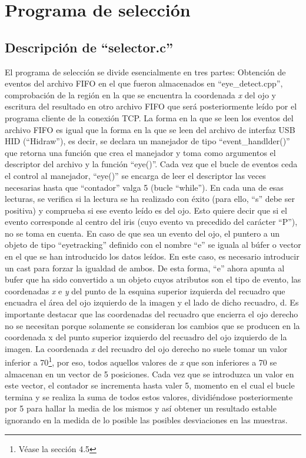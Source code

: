 \section{Programa de selección} \label{s3_4}

\subsection{Descripción de ``selector.c''} \label{s3_4_1}

El programa de selección se divide esencialmente en tres partes: Obtención de eventos del archivo FIFO en el que fueron almacenados en ``eye\_detect.cpp'', comprobación de la región en la que se encuentra la coordenada {\itshape x} del ojo y escritura del resultado en otro archivo FIFO que será posteriormente leído por el programa cliente de la conexión TCP. La forma en la que se leen los eventos del archivo FIFO es igual que la forma en la que se leen del archivo de interfaz USB HID (``Hidraw''), es decir, se declara un manejador de tipo ``event\_handlder()''  que retorna una función que crea el manejador y toma como argumentos el descriptor del archivo y la función ``eye()''. Cada vez que el bucle de eventos ceda el control al manejador, ``eye()'' se encarga de leer el descriptor las veces necesarias hasta que ``contador'' valga 5 (bucle ``while''). En cada una de esas lecturas, se verifica si la lectura se ha realizado con éxito (para ello, ``s'' debe ser positiva) y comprueba si ese evento leído es del ojo. Esto quiere decir que si el evento corresponde al centro del iris (cuyo evento va precedido del carácter ``P''), no se toma en cuenta. En caso de que sea un evento del ojo, el puntero a un objeto de tipo ``eyetracking'' definido con el nombre ``e'' se iguala al búfer o vector en el que se han introducido los datos leídos. En este caso, es necesario introducir un cast para forzar la igualdad de ambos. De esta forma, ``e'' ahora apunta al bufer que ha sido convertido a un objeto cuyos atributos son el tipo de evento, las coordenadas {\itshape x} e {\itshape y} del punto de la esquina superior izquierda del recuadro que encuadra el área del ojo izquierdo de la imagen y el lado de dicho recuadro, d. Es importante destacar que las coordenadas del recuadro que encierra el ojo derecho no se necesitan porque solamente se consideran los cambios que se producen en la coordenada x del punto superior izquierdo del recuadro del ojo izquierdo de la imagen. La coordenada {\itshape x} del recuadro del ojo derecho no suele tomar un valor inferior a 70\footnote{Véase la sección 4.5}, por eso, todos aquellos valores de {\itshape x} que son inferiores a 70 se almacenan en un vector de 5 posiciones. Cada vez que se introduzca un valor en este vector, el contador se incrementa hasta valer 5, momento en el cual el bucle termina y se realiza la suma de todos estos valores, dividiéndose posteriormente por 5 para hallar la media de los mismos y así obtener un resultado estable ignorando en la medida de lo posible las posibles desviaciones en las muestras. 